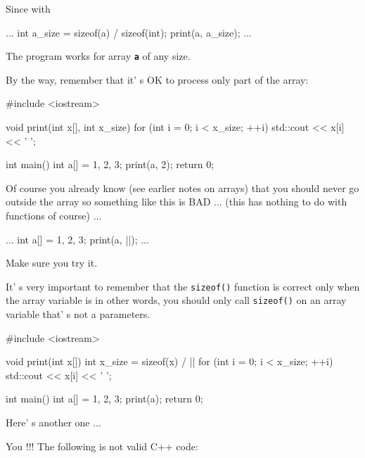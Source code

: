 Since with

\begin{consolethree}[escapeinside=||]
...
int a_size = sizeof(a) / sizeof(int);
print(a, a_size);
...
\end{consolethree}

The program works for array \texttt{\textbf{a}} of any size.

By the way, remember that it' s OK to process only part of the array:

\begin{consolethree}[escapeinside=||]
#include <iostream>

void print(int x[], int x_size)
{
    for (int i = 0; i < x_size; ++i)
    {
        std::cout << x[i] << ' ';
    }
}

int main()
{
    int a[] = {1, 2, 3};
    print(a, 2);
    return 0;
}
\end{consolethree}

Of course you already know (see earlier notes on arrays) that you should never go outside the array so something like this is BAD ... (this has nothing to do with functions of course) ...

\begin{consolethree}[escapeinside=||]
...
int a[] = {1, 2, 3};
print(a, ||);
...
\end{consolethree}

Make sure you try it.

\newpage{}

It' s very important to remember that the \texttt{sizeof()} function is correct only when the array variable is  in other words, you should only call \texttt{sizeof()} on an array variable that' s not a parameters.

\begin{consolethree}[escapeinside=||]
#include <iostream>

void print(int x[])
{
    int x_size = sizeof(x) / ||
    for (int i = 0; i < x_size; ++i)
    {
        std::cout << x[i] << ' ';
    }
}

int main()
{
    int a[] = {1, 2, 3};
    print(a);
    return 0;
}
\end{consolethree}
Here' s another one ...

You !!! The following is not valid C++ code:

